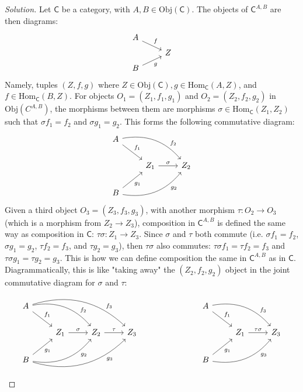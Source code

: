 \documentclass[fontsize=14pt]{scrartcl}
\theoremstyle{definition}
\newenvironment{solution}{
  \begin{proof}[Solution]
  \vspace{-8px}
  \setlength{\parskip}{4px}
  \setlength{\parindent}{0px}
}{
  \end{proof}
}
\newcommand{\Obj}{\mathrm{Obj}}
\newcommand{\Hom}{\mathrm{Hom}}
\begin{document}
\begin{solution}
\def \C {\mathsf{C}}

Let $\C$ be a category, with $A,B\in\Obj(\C)$. The objects of $\C^{A,B}$ are
then diagrams:
%
\[\begin{tikzcd}[row sep=tiny]
A \arrow[dr, "f"]  &   \\
                   & Z \\
B \arrow[ur, "g"'] & 
\end{tikzcd}\]
%
Namely, tuples $(Z,f,g)$ where $Z\in\Obj(\C),g\in\Hom_\C(A,Z)$, and
$f\in\Hom_\C(B,Z)$. For objects $O_1=(Z_1,f_1,g_1)$ and $O_2=(Z_2,f_2,g_2)$ in
$\Obj(C^{A,B})$, the morphisms between them are morphisms
$\sigma\in\Hom_\C(Z_1,Z_2)$ such that $\sigma f_1=f_2$ and $\sigma g_1=g_2$.
This forms the following commutative diagram:
%
\[\begin{tikzcd}
A \arrow[dr, "f_1"] \arrow[drr, bend left, "f_2" near end]    &                               \\
                                                     & Z_1 \arrow[r, "\sigma"] & Z_2 \\
B \arrow[ur, "g_1"'] \arrow[urr, bend right, "g_2"' near end] &
\end{tikzcd}\]
%
Given a third object $O_3=(Z_3,f_3,g_3)$, with another morphism $\tau:O_2\to
O_3$ (which is a morphism from $Z_2\to Z_3$), composition in $\C^{A,B}$ is
defined the same way as composition in $\C$: $\tau\sigma:Z_1\to Z_3$. Since
$\sigma$ and $\tau$ both commute (i.e.  $\sigma f_1=f_2$, $\sigma g_1=g_2$,
$\tau f_2=f_3$, and $\tau g_2=g_3$), then $\tau\sigma$ also commutes: $\tau
\sigma f_1=\tau f_2=f_3$ and $\tau \sigma g_1= \tau g_2 = g_3$. This is how we
can define composition the same in $\C^{A,B}$ as in $\C$. Diagrammatically, this
is like "taking away" the $(Z_2,f_2,g_2)$ object in the joint commutative
diagram for $\sigma$ and $\tau$:
\[
\begin{tikzcd}
A \arrow[dr, "f_1"] \arrow[drr, bend left, "f_2" near end] \arrow[drrr, bend left, "f_3" near end] & & \\
  & Z_1 \arrow[r, "\sigma"] & Z_2 \arrow[r, "\tau"] & Z_3 \\
B \arrow[ur, "g_1"'] \arrow[urr, bend right, "g_2"' near end] \arrow[urrr, bend right, "g_3"' near end] & &
\end{tikzcd}
\hspace{1in}
\begin{tikzcd}
A \arrow[dr, "f_1"] \arrow[drr, bend left, "f_3" near end]    &                               \\
                                                     & Z_1 \arrow[r, "\tau\sigma"] & Z_3 \\
B \arrow[ur, "g_1"'] \arrow[urr, bend right, "g_3"' near end] &
\end{tikzcd}
\]
\end{solution}
\end{document}

